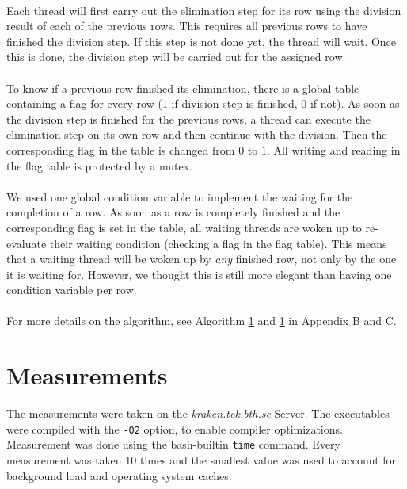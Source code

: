 \documentclass[]{article}
\begin{document}
\paragraph{} Each thread will first carry out the elimination step for its row using the division result of each of the previous rows. This requires all previous rows to have finished the division step. If this step is not done yet, the thread will wait. Once this is done, the division step will be carried out for the assigned row.

\paragraph{} To know if a previous row finished its elimination, there is a global table containing a flag for every row ($1$ if division step is finished, $0$ if not). As soon as the division step is finished for the previous rows, a thread can execute the elimination step on its own row and then continue with the division. Then the corresponding flag in the table is changed from $0$ to $1$. All writing and reading in the flag table is protected by a mutex.

\paragraph{} We used one global condition variable to implement the waiting for the completion of a row. As soon as a row is completely finished and the corresponding flag is set in the table, all waiting threads are woken up to re-evaluate their waiting condition (checking a flag in the flag table). This means that a waiting thread will be woken up by \emph{any} finished row, not only by the one it is waiting for. However, we thought this is still more elegant than having one condition variable per row.

\paragraph{} For more details on the algorithm, see Algorithm \ref{} and \ref{} in Appendix B and C.

\section{Measurements}

The measurements were taken on the \emph{kraken.tek.bth.se} Server. The executables were compiled with the \texttt{-O2} option, to enable compiler optimizations. Measurement was done using the bash-builtin \texttt{time} command. Every measurement was taken 10 times and the smallest value was used to account for background load and operating system caches.
\end{document}

